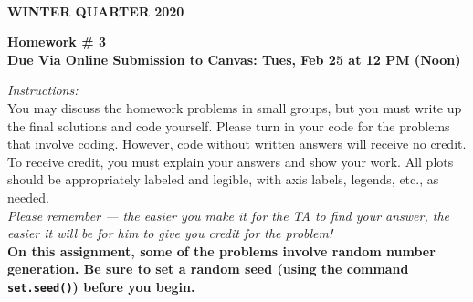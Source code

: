 \documentclass[12pt]{article}
\begin{document}
\\
{\bf WINTER QUARTER 2020}\\


\vspace{5mm}

\begin{center}
{\bf Homework \# 3}\\
{\bf Due Via Online Submission to Canvas: Tues, Feb 25 at 12 PM (Noon) }
\end{center}
\vspace{10mm}

\noindent \emph{Instructions:}\\

 You may discuss the homework problems in small groups, but you must write up the final solutions and code yourself. 
Please turn in your code for the problems that involve coding.  However, code without written answers will receive no credit. To receive credit, you must explain your answers and show your work. All plots should be appropriately labeled and legible, with axis labels, legends, etc., as needed. \\

\emph{Please remember --- the easier you make it for the TA to find your answer, the easier it will be for him to give you credit for the problem!} \\

{\bf  On this assignment, some of the problems involve random number generation. Be sure to set a random seed (using the command \verb=set.seed()=) before you begin.}

\vspace{10mm}
\end{document}
